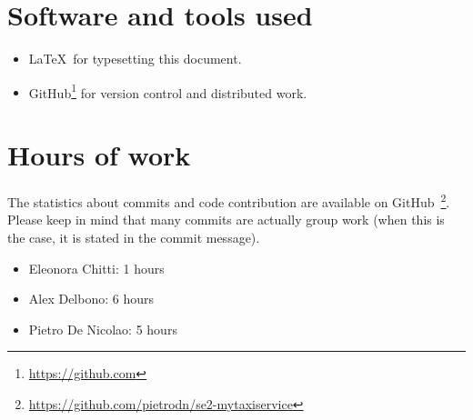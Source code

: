 \section{Software and tools used}
\begin{itemize}
    \item \LaTeX\, for typesetting this document.
    \item GitHub\footnote{\url{https://github.com}} for version control and distributed work.
\end{itemize}

\section{Hours of work}
The statistics about commits and code contribution are available on GitHub~\footnote{\url{https://github.com/pietrodn/se2-mytaxiservice}}.
Please keep in mind that many commits are actually group work (when this is the case, it is stated in the commit message).

\begin{itemize}
    \item Eleonora Chitti: 1 hours
    \item Alex Delbono: 6 hours
    \item Pietro De Nicolao: 5 hours
\end{itemize}
